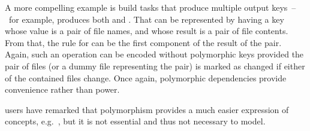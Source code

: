 A more compelling example is build tasks that produce multiple output
keys~--~for example,  produces both  and .
That can be represented by having a key whose value is a pair of file names, and
whose result is a pair of file contents. From that, the rule for 
can be the first component of the result of the pair. Again, such an operation
can be encoded without polymorphic keys provided the pair of files (or a dummy
file representing the pair) is marked as changed if either of the contained
files change. Once again, polymorphic dependencies provide convenience rather
than power.

\Shake users have remarked that polymorphism provides a much easier expression
of concepts, e.g.~\cite{hadrian}, but it is not essential and thus not necessary
to model.
